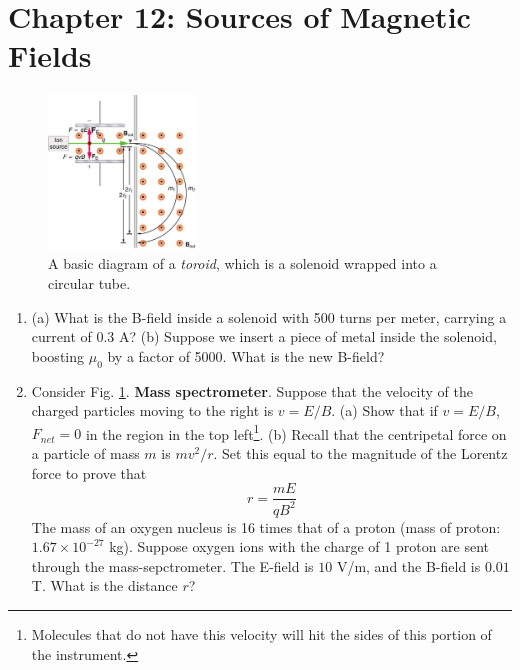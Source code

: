 \documentclass[10pt]{article}
\begin{document}
\section{Chapter 12: Sources of Magnetic Fields}

\begin{figure}[ht]
\centering
\includegraphics[width=0.35\textwidth]{vsel.jpeg}
\caption{\label{fig:chap12_1} A basic diagram of a \textit{toroid}, which is a solenoid wrapped into a circular tube.}
\end{figure}

\begin{enumerate}
\item (a) What is the B-field inside a solenoid with 500 turns per meter, carrying a current of 0.3 A? (b) Suppose we insert a piece of metal inside the solenoid, boosting $\mu_0$ by a factor of 5000.  What is the new B-field?  \\ \vspace{3cm}
\item Consider Fig. \ref{fig:chap12_1}.  \textbf{Mass spectrometer}.  Suppose that the 	velocity of the charged particles moving to the right is $v = E/B$.  (a) Show that if $v = E/B$, $F_{net} = 0$ in the region in the top left\footnote{Molecules that do not have this velocity will hit the sides of this portion of the instrument.}.  (b) Recall that the centripetal force on a particle of mass $m$ is $mv^2/r$.  Set this equal to the magnitude of the Lorentz force to prove that 
\begin{equation}
r = \frac{m E}{q B^2}
\end{equation}
The mass of an oxygen nucleus is 16 times that of a proton (mass of proton: $1.67 \times 10^{-27}$ kg).  Suppose oxygen ions with the charge of 1 proton are sent through the mass-sepctrometer.  The E-field is $10$ V/m, and the B-field is $0.01$ T.  What is the distance $r$?
\\ \vspace{1cm}
\end{enumerate}
\end{document}
